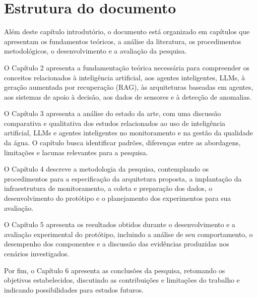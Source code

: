 \section{Estrutura do documento}
\label{sec:estrutura-documento}

Além deste capítulo introdutório, o documento está organizado em capítulos que apresentam os fundamentos teóricos, a análise da literatura, os procedimentos metodológicos, o desenvolvimento e a avaliação da pesquisa.

O Capítulo 2 apresenta a fundamentação teórica necessária para compreender os conceitos relacionados à inteligência artificial, aos agentes inteligentes, LLMs, à geração aumentada por recuperação (RAG), às arquiteturas baseadas em agentes, aos sistemas de apoio à decisão, aos dados de sensores e à detecção de anomalias.

O Capítulo 3 apresenta a análise do estado da arte, com uma discussão comparativa e qualitativa dos estudos relacionados ao uso de inteligência artificial, LLMs e agentes inteligentes no monitoramento e na gestão da qualidade da água. O capítulo busca identificar padrões, diferenças entre as abordagens, limitações e lacunas relevantes para a pesquisa.

O Capítulo 4 descreve a metodologia da pesquisa, contemplando os procedimentos para a especificação da arquitetura proposta, a implantação da infraestrutura de monitoramento, a coleta e preparação dos dados, o desenvolvimento do protótipo e o planejamento dos experimentos para sua avaliação.

O Capítulo 5 apresenta os resultados obtidos durante o desenvolvimento e a avaliação experimental do protótipo, incluindo a análise de seu comportamento, o desempenho dos componentes e a discussão das evidências produzidas nos cenários investigados.

Por fim, o Capítulo 6 apresenta as conclusões da pesquisa, retomando os objetivos estabelecidos, discutindo as contribuições e limitações do trabalho e indicando possibilidades para estudos futuros.
